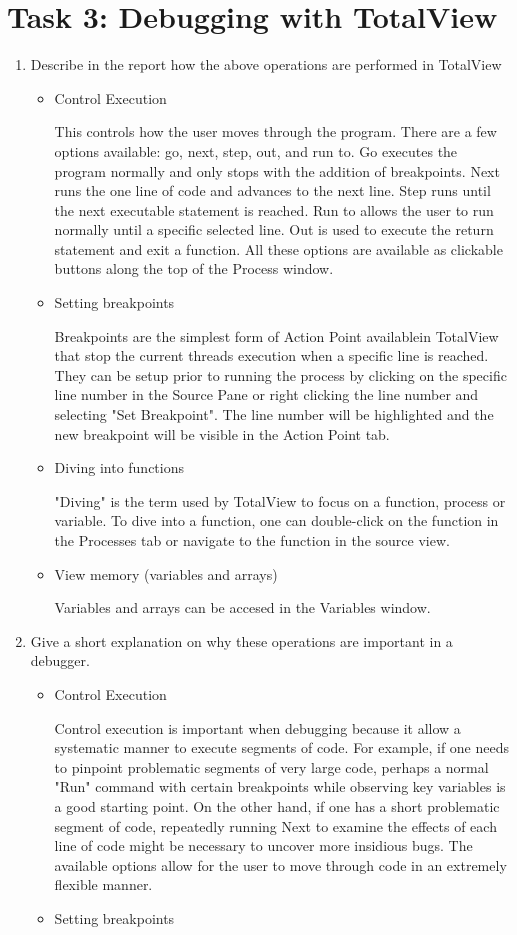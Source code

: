 \documentclass{article}
\begin{document}
\section{Task 3: Debugging with TotalView}
\begin{enumerate}
\item Describe in the report how the above operations are performed in TotalView
	\begin{itemize}
	\item Control Execution
	
	This controls how the user moves through the program. There are a few options available: go, next, step, out, and run to. Go executes the program normally and only stops with the addition of breakpoints. Next runs the one line of code and advances to the next line. Step runs until the next executable statement is reached. Run to allows the user to run normally until a specific selected line. Out is used to execute the return statement and exit a function. All these options are available as clickable buttons along the top of the Process window.
	\item Setting breakpoints
	
	Breakpoints are the simplest form of Action Point availablein TotalView that stop the current threads execution when a specific line is reached. They can be setup prior to running the process by clicking on the specific line number in the Source Pane or right clicking the line number and selecting "Set Breakpoint". The line number will be highlighted and the new breakpoint will be visible in the Action Point tab.
	\item Diving into functions
	
	"Diving" is the term used by TotalView to focus on a function, process or variable. To dive into a function, one can double-click on the function in the Processes tab or navigate to the function in the source view.
	\item View memory (variables and arrays)
	
	Variables and arrays can be accesed in the Variables window.

	\end{itemize}
\item Give a short explanation on why these operations are important in a debugger.
	\begin{itemize}
	\item Control Execution
	
	Control execution is important when debugging because it allow a systematic manner to execute segments of code. For example, if one needs to pinpoint problematic segments of very large code, perhaps a normal "Run" command with certain breakpoints while observing key variables is a good starting point. On the other hand, if one has a short problematic segment of code, repeatedly running Next to examine the effects of each line of code might be necessary to uncover more insidious bugs. The available options allow for the user to move through code in an extremely flexible manner.
	\item Setting breakpoints
		

\end{itemize}
\end{enumerate}
\end{document}
